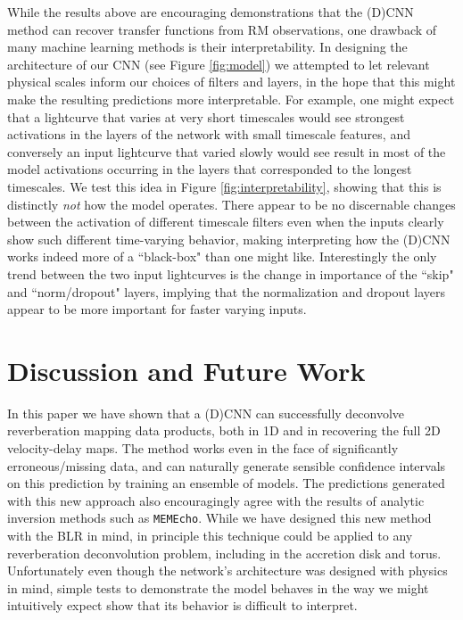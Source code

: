 \documentclass[floatfix,twocolumn,trackchanges,linenumbers]{aastex7}
\begin{document}
While the results above are encouraging demonstrations that the (D)CNN method can recover transfer functions from RM observations, one drawback of many machine learning methods is their interpretability. In designing the architecture of our CNN (see Figure \ref{fig:model}) we attempted to let relevant physical scales inform our choices of filters and layers, in the hope that this might make the resulting predictions more interpretable. For example, one might expect that a lightcurve that varies at very short timescales would see strongest activations in the layers of the network with small timescale features, and conversely an input lightcurve that varied slowly would see result in most of the model activations occurring in the layers that corresponded to the longest timescales. We test this idea in Figure \ref{fig:interpretability}, showing that this is distinctly \textit{not} how the model operates. 
There appear to be no discernable changes between the activation of different timescale filters even when the inputs clearly show such different time-varying behavior, making interpreting how the (D)CNN works indeed more of a ``black-box" than one might like. Interestingly the only trend between the two input lightcurves is the change in importance of the ``skip" and ``norm/dropout" layers, implying that the normalization and dropout layers appear to be more important for faster varying inputs. 

\section{Discussion and Future Work}\label{sec:discussion}
In this paper we have shown that a (D)CNN can successfully deconvolve reverberation mapping data products, both in 1D and in recovering the full 2D velocity-delay maps. The method works even in the face of significantly erroneous/missing data, and can naturally generate sensible confidence intervals on this prediction by training an ensemble of models. The predictions generated with this new approach also encouragingly agree with the results of analytic inversion methods such as \texttt{MEMEcho}. While we have designed this new method with the BLR in mind, in principle this technique could be applied to any reverberation deconvolution problem, including in the accretion disk and torus. Unfortunately even though the network's architecture was designed with physics in mind, simple tests to demonstrate the model behaves in the way we might intuitively expect show that its behavior is difficult to interpret.
\end{document}
